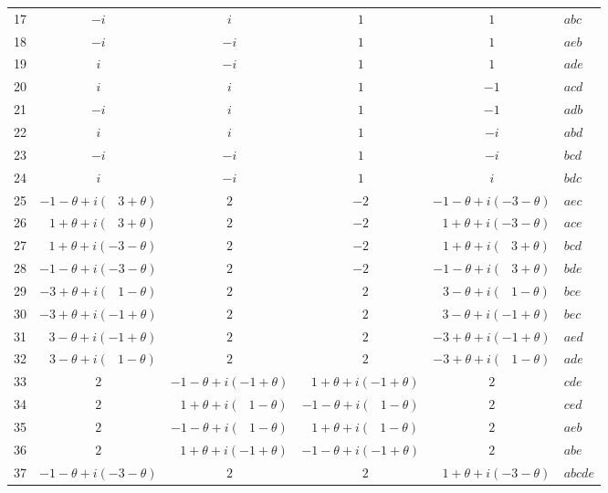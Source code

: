\documentclass[11pt,a4paper]{article}
\begin{document}
\begin{center}
\begin{longtable}{r|c|c|c|c|l}
\hline
17 & $-i$ & $i$  & $1$ & $1$  & $abc$\\
18 & $-i$ & $-i$ & $1$ & $1$  & $aeb$\\
19 & $i$  & $-i$ & $1$ & $1$  & $ade$\\
20 & $i$  & $i$  & $1$ & $-1$ & $acd$\\
21 & $-i$ & $i$  & $1$ & $-1$ & $adb$\\
22 & $i$  & $i$  & $1$ & $-i$ & $abd$\\
23 & $-i$ & $-i$ & $1$ & $-i$ & $bcd$\\
24 & $i$  & $-i$ & $1$ & $i$  & $bdc$\\
\hline
25 & $-1 - \theta + i(\;\;\,3 + \theta)$ & $2$ & $-2$
         & $-1 - \theta + i(-3 - \theta)$ & $aec$\\
26 & $\;\;\,1 + \theta + i(\;\;\,3 + \theta)$ & $2$ & $-2$
         & $\;\;\,1 + \theta + i(-3 - \theta)$ & $ace$\\
27 & $\;\;\,1 + \theta + i(-3 - \theta)$ & $2$ & $-2$
         & $\;\;\,1 + \theta + i(\;\;\,3 + \theta)$ & $bcd$\\
28 & $-1 - \theta + i(-3 - \theta)$ & $2$ & $-2$
         & $-1 - \theta + i(\;\;\,3 + \theta)$ & $bde$\\
29 & $-3 + \theta + i(\;\;\,1 - \theta)$ & $2$ & $\;\;\,2$
         & $\;\;\,3 - \theta + i(\;\;\,1 - \theta)$ & $bce$\\
30 & $-3 + \theta + i(-1 + \theta)$ & $2$ & $\;\;\,2$
         & $\;\;\,3 - \theta + i(-1 + \theta)$ & $bec$\\
31 & $\;\;\,3 - \theta + i(-1 + \theta)$ & $2$ & $\;\;\,2$
         & $-3 + \theta + i(-1 + \theta)$ & $aed$\\
32 & $\;\;\,3 - \theta + i(\;\;\,1 - \theta)$ & $2$ & $\;\;\,2$
         & $-3 + \theta + i(\;\;\,1 - \theta)$ & $ade$\\
\hline
33 & $2$ & $-1 - \theta + i(-1 + \theta)$
         & $\;\;\,1 + \theta + i(-1 + \theta)$ & $2$ & $cde$\\
34 & $2$ & $\;\;\,1 + \theta + i(\;\;\,1 - \theta)$
         & $-1 - \theta + i(\;\;\,1 - \theta)$ & $2$ & $ced$\\
35 & $2$ & $-1 - \theta + i(\;\;\,1 - \theta)$
         & $\;\;\,1 + \theta + i(\;\;\,1 - \theta)$ & $2$ & $aeb$\\
36 & $2$ & $\;\;\,1 + \theta + i(-1 + \theta)$
         & $-1 - \theta + i(-1 + \theta)$ & $2$ & $abe$\\
\hline
37 & $-1 - \theta + i(-3 - \theta)$ & $2$ & $\;\;\,2$
         & $\;\;\,1 + \theta + i(-3 - \theta)$ & $abcde$\\

\end{longtable}
\end{center}
\end{document}
